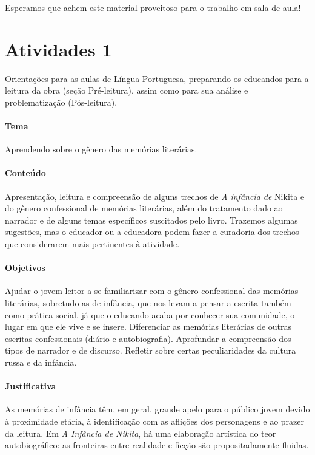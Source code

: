 \documentclass{article}
\begin{document}
Esperamos que achem este material proveitoso para o trabalho em sala de
aula!


\section{Atividades 1}

\bnccativividadespreleitura

Orientações para as aulas de Língua Portuguesa, preparando os
educandos para a leitura da obra (seção Pré-leitura), assim como para
sua análise e problematização (Pós-leitura).

\paragraph{Tema} Aprendendo sobre o gênero das memórias literárias.

\paragraph{Conteúdo}
Apresentação, leitura e compreensão de alguns trechos de \emph{A
infância de} Nikita e do gênero confessional de memórias literárias,
além do tratamento dado ao narrador e de alguns temas específicos
suscitados pelo livro. Trazemos algumas sugestões, mas o educador ou a
educadora podem fazer a curadoria dos trechos que considerarem mais
pertinentes à atividade.

\paragraph{Objetivos}
Ajudar o jovem leitor a se familiarizar com o gênero confessional das
memórias literárias, sobretudo as de infância, que nos levam a pensar a
escrita também como prática social, já que o educando acaba por conhecer
sua comunidade, o lugar em que ele vive e se insere. Diferenciar as
memórias literárias de outras escritas confessionais (diário e
autobiografia). Aprofundar a compreensão dos tipos de narrador e de
discurso. Refletir sobre certas peculiaridades da cultura russa e da
infância.

\paragraph{Justificativa}
As memórias de infância têm, em geral, grande apelo para o público jovem
devido à proximidade etária, à identificação com as aflições dos
personagens e ao prazer da leitura. Em \emph{A Infância de Nikita}, há
uma elaboração artística do teor autobiográfico: as fronteiras entre
realidade e ficção são propositadamente fluidas.
\end{document}

